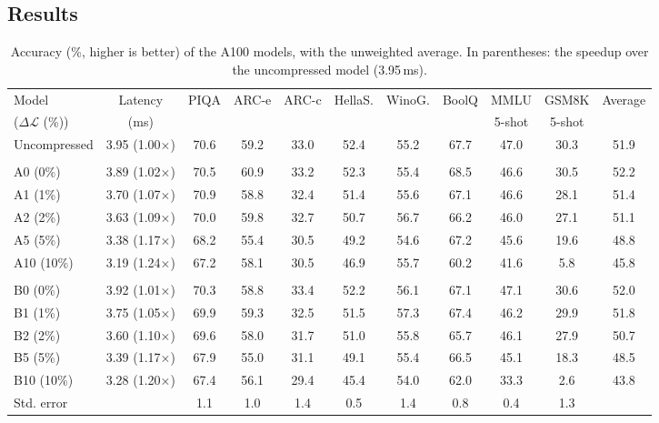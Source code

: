 \documentclass[11pt]{article}
\newcommand{\dloss}{\Delta\mathcal{L}}
\begin{document}
\clearpage
\subsection{Results}

\begin{table}[!ht]
\centering
\small
\setlength{\tabcolsep}{3pt}
\begin{tabular}{lcccccccccc}
\toprule
Model & Latency & PIQA & ARC-e & ARC-c & HellaS. & WinoG. & BoolQ & MMLU & GSM8K & Average \\
($\dloss$ (\%)) & (ms)   &      &       &       &         &        &       & 5-shot & 5-shot & \\
\midrule
Uncompressed & 3.95 (1.00$\times$) & 70.6 & 59.2 & 33.0 & 52.4 & 55.2 & 67.7 & 47.0 & 30.3 & 51.9 \\
\addlinespace
\multicolumn{11}{l}{\emph{2 objectives}} \\
A0  (0\%)  & 3.89 (1.02$\times$) & 70.5 & 60.9 & 33.2 & 52.3 & 55.4 & 68.5 & 46.6 & 30.5 & 52.2 \\
A1  (1\%)  & 3.70 (1.07$\times$) & 70.9 & 58.8 & 32.4 & 51.4 & 55.6 & 67.1 & 46.6 & 28.1 & 51.4 \\
A2  (2\%)  & 3.63 (1.09$\times$) & 70.0 & 59.8 & 32.7 & 50.7 & 56.7 & 66.2 & 46.0 & 27.1 & 51.1 \\
A5  (5\%)  & 3.38 (1.17$\times$) & 68.2 & 55.4 & 30.5 & 49.2 & 54.6 & 67.2 & 45.6 & 19.6 & 48.8 \\
A10 (10\%) & 3.19 (1.24$\times$) & 67.2 & 58.1 & 30.5 & 46.9 & 55.7 & 60.2 & 41.6 &  5.8 & 45.8 \\
\addlinespace
\multicolumn{11}{l}{\emph{3 objectives}} \\
B0  (0\%)  & 3.92 (1.01$\times$) & 70.3 & 58.8 & 33.4 & 52.2 & 56.1 & 67.1 & 47.1 & 30.6 & 52.0 \\
B1  (1\%)  & 3.75 (1.05$\times$) & 69.9 & 59.3 & 32.5 & 51.5 & 57.3 & 67.4 & 46.2 & 29.9 & 51.8 \\
B2  (2\%)  & 3.60 (1.10$\times$) & 69.6 & 58.0 & 31.7 & 51.0 & 55.8 & 65.7 & 46.1 & 27.9 & 50.7 \\
B5  (5\%)  & 3.39 (1.17$\times$) & 67.9 & 55.0 & 31.1 & 49.1 & 55.4 & 66.5 & 45.1 & 18.3 & 48.5 \\
B10 (10\%) & 3.28 (1.20$\times$) & 67.4 & 56.1 & 29.4 & 45.4 & 54.0 & 62.0 & 33.3 &  2.6 & 43.8 \\
\midrule
Std. error &      & 1.1  & 1.0  & 1.4  & 0.5  & 1.4  & 0.8  & 0.4  & 1.3  & \\
\bottomrule
\end{tabular}
\caption{Accuracy (\%, higher is better) of the A100 models, with the unweighted average. In parentheses: the speedup over the uncompressed model (3.95\,ms).}
\label{tab:a100results}
\end{table}
\end{document}
